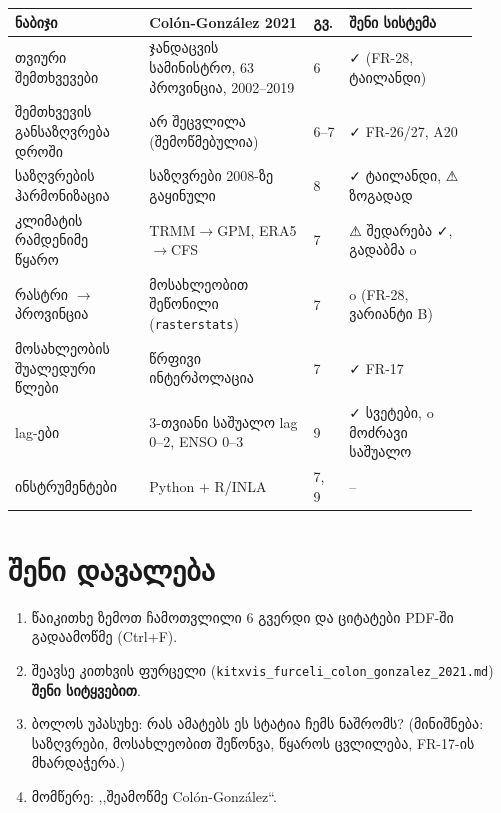 \documentclass[11pt,a4paper]{article}
\newcommand{\ok}{{\symfont ✓}}
\newcommand{\warn}{{\symfont ⚠}}
\newcommand{\q}[1]{,,#1``}
\begin{document}
\begin{longtable}{@{}p{0.27\linewidth}p{0.33\linewidth}p{0.06\linewidth}p{0.26\linewidth}@{}}
\toprule
ნაბიჯი & Colón-González 2021 & გვ. & შენი სისტემა \\
\midrule
\endhead
თვიური შემთხვევები & ჯანდაცვის სამინისტრო, 63 პროვინცია, 2002--2019 & 6 & \ok{} (FR-28, ტაილანდი) \\
შემთხვევის განსაზღვრება დროში & არ შეცვლილა (შემოწმებულია) & 6--7 & \ok{} FR-26/27, A20 \\
საზღვრების ჰარმონიზაცია & საზღვრები 2008-ზე გაყინული & 8 & \ok{} ტაილანდი, \warn{} ზოგადად \\
კლიმატის რამდენიმე წყარო & TRMM$\rightarrow$GPM, ERA5$\rightarrow$CFS & 7 & \warn{} შედარება \ok{}, გადაბმა 
o{} \\
რასტრი $\rightarrow$ პროვინცია & მოსახლეობით შეწონილი (\texttt{rasterstats}) & 7 & 
o{} (FR-28, ვარიანტი B) \\
მოსახლეობის შუალედური წლები & წრფივი ინტერპოლაცია & 7 & \ok{} FR-17 \\
lag-ები & 3-თვიანი საშუალო lag 0--2, ENSO 0--3 & 9 & \ok{} სვეტები, 
o{} მოძრავი საშუალო \\
ინსტრუმენტები & Python + R/INLA & 7, 9 & -- \\
\bottomrule
\end{longtable}

\section{შენი დავალება}
\begin{enumerate}[nosep]
  \item წაიკითხე ზემოთ ჩამოთვლილი 6 გვერდი და ციტატები PDF-ში გადაამოწმე (Ctrl+F).
  \item შეავსე კითხვის ფურცელი (\texttt{kitxvis\_furceli\_colon\_gonzalez\_2021.md}) \textbf{შენი სიტყვებით}.
  \item ბოლოს უპასუხე: რას ამატებს ეს სტატია ჩემს ნაშრომს? (მინიშნება: საზღვრები, მოსახლეობით შეწონვა,
        წყაროს ცვლილება, FR-17-ის მხარდაჭერა.)
  \item მომწერე: \q{შეამოწმე Colón-González}.
\end{enumerate}
\end{document}
